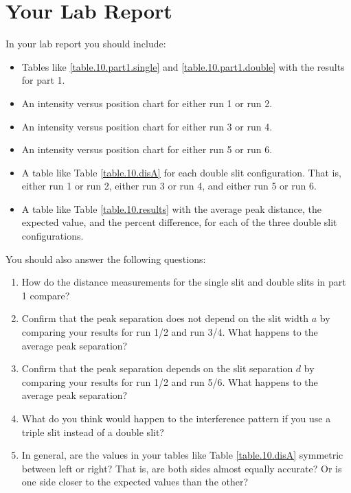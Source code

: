 \section{Your Lab Report}
%
In your lab report you should include:
\begin{itemize}
	\item Tables like \ref{table.10.part1.single} and \ref{table.10.part1.double} with the results for part 1.
	\item An intensity versus position chart for either run 1 or run 2.
	\item An intensity versus position chart for either run 3 or run 4.
	\item An intensity versus position chart for either run 5 or run 6.
	\item A table like Table \ref{table.10.disA} for each double slit configuration. That is, either run 1 or run 2, either run 3 or run 4, and either run 5 or run 6.
	\item A table like Table \ref{table.10.results} with the average peak distance, the expected value, and the percent difference, for each of the three double slit configurations.
\end{itemize}
You should also answer the following questions:
\begin{enumerate}
	\item How do the distance measurements for the single slit and double slits in part 1 compare?
	\item Confirm that the peak separation does not depend on the slit width $a$ by comparing your results for run 1/2 and run 3/4. What happens to the average peak separation?
	\item Confirm that the peak separation depends on the slit separation $d$ by comparing your results for run 1/2 and run 5/6. What happens to the average peak separation?
	\item What do you think would happen to the interference pattern if you use a triple slit instead of a double slit?
	\item In general, are the values in your tables like Table \ref{table.10.disA} symmetric between left or right? That is, are both sides almost equally accurate? Or is one side closer to the expected values than the other?
\end{enumerate}
%
\newpage
